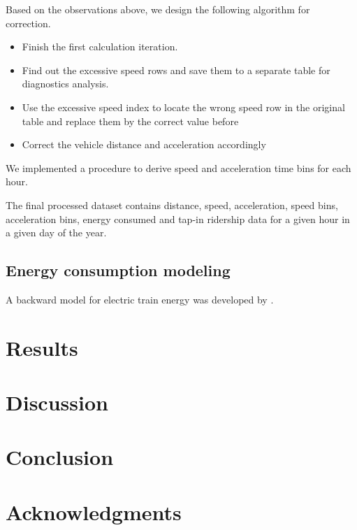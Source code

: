 \documentclass[preprint, 11pt]{elsarticle}
\newcommand{\?}{\stackrel{?}{=}}
\begin{document}
Based on the observations above, we design the following algorithm for correction.
\begin{itemize}
\item Finish the first calculation iteration.
\item Find out the excessive speed rows and save them to a separate table for diagnostics analysis.
\item Use the excessive speed index to locate the wrong speed row in the original table and replace them by the correct value before
\item Correct the vehicle distance and acceleration accordingly
\end{itemize}

We implemented a procedure to derive speed and acceleration time bins for each hour. 

The final processed dataset contains distance, speed, acceleration, speed bins, acceleration bins, energy consumed and tap-in ridership data for a given hour in a given day of the year.

\subsection{Energy consumption modeling}
A backward model for electric train energy was developed by \cite{wang2017electric}.

\section{Results}

\section{Discussion}

\section{Conclusion}

\section*{Acknowledgments}



\end{document}
